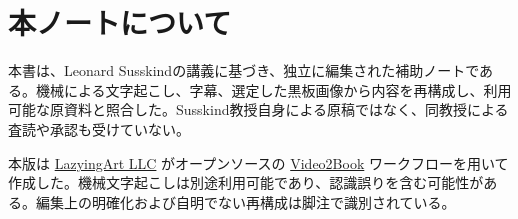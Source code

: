 \documentclass[11pt,oneside]{book}
\begin{document}
\frontmatter
\hypersetup{pageanchor=false}

\hypersetup{pageanchor=true}

\clearpage
\chapter*{本ノートについて}
本書は、Leonard Susskindの講義に基づき、独立に編集された補助ノートである。機械による文字起こし、字幕、選定した黒板画像から内容を再構成し、利用可能な原資料と照合した。Susskind教授自身による原稿ではなく、同教授による査読や承認も受けていない。

本版は \href{https://lazying.art}{LazyingArt LLC} がオープンソースの \href{https://github.com/lachlanchen/Video2Book}{Video2Book} ワークフローを用いて作成した。機械文字起こしは別途利用可能であり、認識誤りを含む可能性がある。編集上の明確化および自明でない再構成は脚注で識別されている。
\clearpage
\tableofcontents
\mainmatter










\end{document}
